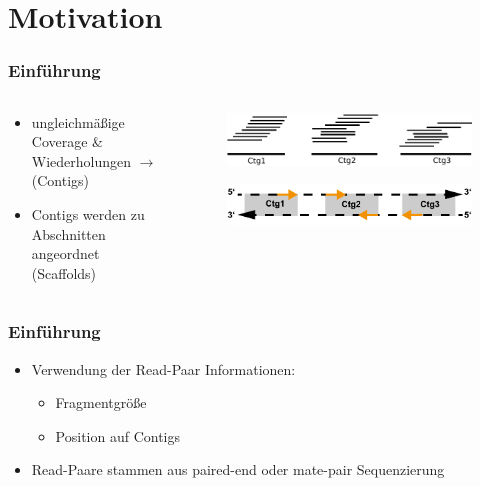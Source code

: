 \documentclass[xcolor=pst]{beamer}
\begin{document}
\section{Motivation}
\begin{frame}
\setcounter{framenumber}{1}
  \frametitle{Einführung}

  \begin{columns}
    \begin{column}{.45\textwidth}
      \begin{itemize}
      \item ungleichmäßige Coverage \& Wiederholungen $\rightarrow$
         (Contigs)
      \item Contigs werden zu Abschnitten angeordnet (Scaffolds)
      \end{itemize}
    \end{column}
    \begin{column}{.45\textwidth}
      \begin{center}
        \begin{figure}[t]
          \includegraphics[width=\textwidth,height=0.8\textheight,keepaspectratio]{figures/Scaffolding.pdf}
        \end{figure}
        \begin{figure}[t]
          \includegraphics[width=\textwidth,height=0.8\textheight,keepaspectratio]{figures/Scaffolding_2.pdf}
        \end{figure}
      \end{center}
    \end{column}
  \end{columns}
\end{frame}

\begin{frame}
  \frametitle{Einführung}
  \begin{itemize}
  \item Verwendung der Read-Paar Informationen:
    \begin{itemize}
    \item Fragmentgröße
    \item Position auf Contigs
    \end{itemize}
  \item Read-Paare stammen aus paired-end oder mate-pair Sequenzierung
  \end{itemize}
\end{frame}
\end{document}
